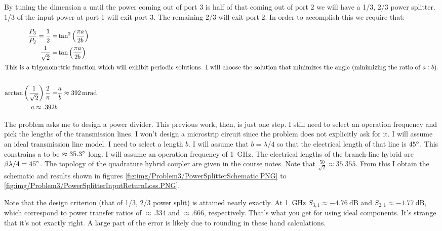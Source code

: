 By tuning the dimension a until the power coming out of port 3 is half of that
coming out of port 2 we will have a 1/3, 2/3 power splitter. 1/3 of the input
power at port 1 will exit port 3. The remaining 2/3 will exit port 2. In order
to accomplish this we require that:

\begin{align*}
    \frac{P_3}{P_2} = \frac{1}{2} =& \tan^2 \left( \frac{\pi a}{2 b} \right) \\
    \frac{1}{\sqrt{2}} =& \tan \left( \frac{\pi a }{2 b} \right) \\
    \intertext{This is a trigonometric function which will exhibit periodic
        solutions. I will choose the solution that minimizes the angle
    (minimizing the ratio of $a:b$).} \\
    \arctan \left( \frac{1}{\sqrt{2}} \right) \frac{2}{\pi} =& \frac{a}{b}
    \approx \SI{392}{\milli\radian} \\
    a \approx .392 b
\end{align*}

The problem asks me to design a power divider. This previous work, then, is just
one step. I still need to select an operation frequency and pick the lengths of
the transmission lines. I won't design a microstrip circuit since the problem
does not explicitly ask for it. I will assume an ideal transmission line model.
I need to select a length $b$. I will assume that $b = \lambda/4$ so that the
electrical length of that line is $45 \degree$. This constrains a to be $\approx
35.3 \degree$ long.  I will assume an operation frequency of
\SI{1}{\giga\hertz}. The electrical lengths of the branch-line hybrid are $\beta
\lambda/4 = 45 \degree$. The topology of the quadrature hybrid coupler are given
in the course notes. Note that $\frac{50}{\sqrt{2}}\approx 35.355$. From this I
obtain the schematic  and results shown in figures
\ref{fig:img/Problem3/PowerSplitterSchematic.PNG} to
\ref{fig:img/Problem3/PowerSplitterInputReturnLoss.PNG}. 

Note that the design criterion (that of 1/3, 2/3 power split) is attained nearly
exactly. At \SI{1}{\giga\hertz} $S_{3,1} \approx \SI{-4.76}{\deci\bel}$ and
$S_{2,1} \approx \SI{-1.77}{\deci\bel}$, which correspond to power transfer
ratios of $\approx .334$ and $\approx .666$, respectively. That's what you get
for using ideal components. It's strange that it's not exactly right. A large
part of the error is likely due to rounding in these hand calculations.

